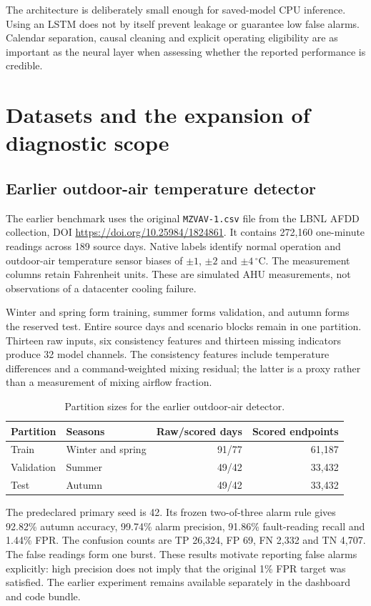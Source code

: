 The architecture is deliberately small enough for saved-model CPU inference. Using an LSTM does not by itself prevent leakage or guarantee low false alarms. Calendar separation, causal cleaning and explicit operating eligibility are as important as the neural layer when assessing whether the reported performance is credible.

\section{Datasets and the expansion of diagnostic scope}
\subsection{Earlier outdoor-air temperature detector}
The earlier benchmark uses the original \texttt{MZVAV-1.csv} file from the LBNL AFDD collection, DOI \url{https://doi.org/10.25984/1824861}. It contains 272,160 one-minute readings across 189 source days. Native labels identify normal operation and outdoor-air temperature sensor biases of $\pm1$, $\pm2$ and $\pm4\,^{\circ}\mathrm{C}$. The measurement columns retain Fahrenheit units. These are simulated AHU measurements, not observations of a datacenter cooling failure.

Winter and spring form training, summer forms validation, and autumn forms the reserved test. Entire source days and scenario blocks remain in one partition. Thirteen raw inputs, six consistency features and thirteen missing indicators produce 32 model channels. The consistency features include temperature differences and a command-weighted mixing residual; the latter is a proxy rather than a measurement of mixing airflow fraction.

\begin{table}[htbp]\centering\small
\caption{Partition sizes for the earlier outdoor-air detector.}\label{tab:old-split}
\begin{tabularx}{\linewidth}{l X r r}
\toprule
Partition & Seasons & Raw/scored days & Scored endpoints \\
\midrule
Train & Winter and spring & 91/77 & 61,187 \\
Validation & Summer & 49/42 & 33,432 \\
Test & Autumn & 49/42 & 33,432 \\
\bottomrule\end{tabularx}
\end{table}

The predeclared primary seed is 42. Its frozen two-of-three alarm rule gives 92.82\% autumn accuracy, 99.74\% alarm precision, 91.86\% fault-reading recall and 1.44\% FPR. The confusion counts are TP 26,324, FP 69, FN 2,332 and TN 4,707. The false readings form one burst. These results motivate reporting false alarms explicitly: high precision does not imply that the original 1\% FPR target was satisfied. The earlier experiment remains available separately in the dashboard and code bundle.

